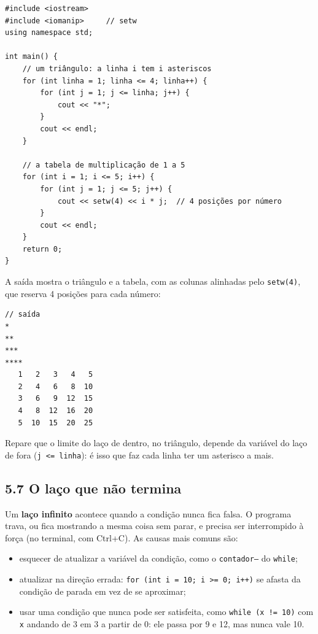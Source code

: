 \begin{codigo}
\begin{Verbatim}[breaklines=true, breaksymbolleft={}, fontsize=\footnotesize]
#include <iostream>
#include <iomanip>     // setw
using namespace std;

int main() {
    // um triângulo: a linha i tem i asteriscos
    for (int linha = 1; linha <= 4; linha++) {
        for (int j = 1; j <= linha; j++) {
            cout << "*";
        }
        cout << endl;
    }

    // a tabela de multiplicação de 1 a 5
    for (int i = 1; i <= 5; i++) {
        for (int j = 1; j <= 5; j++) {
            cout << setw(4) << i * j;  // 4 posições por número
        }
        cout << endl;
    }
    return 0;
}
\end{Verbatim}
\end{codigo}

A saída mostra o triângulo e a tabela, com as colunas alinhadas pelo \texttt{setw(4)}, que reserva 4 posições para cada número:

\begin{codigo}
\begin{Verbatim}[breaklines=true, breaksymbolleft={}, fontsize=\footnotesize]
// saída
*
**
***
****
   1   2   3   4   5
   2   4   6   8  10
   3   6   9  12  15
   4   8  12  16  20
   5  10  15  20  25
\end{Verbatim}
\end{codigo}

Repare que o limite do laço de dentro, no triângulo, depende da variável do laço de fora (\texttt{j <= linha}): é isso que faz cada linha ter um asterisco a mais.

\subsection{5.7 O laço que não termina}

Um \textbf{laço infinito} acontece quando a condição nunca fica falsa. O programa trava, ou fica mostrando a mesma coisa sem parar, e precisa ser interrompido à força (no terminal, com Ctrl+C). As causas mais comuns são:

\begin{itemize}
  \item esquecer de atualizar a variável da condição, como o \texttt{contador--} do \texttt{while};
  \item atualizar na direção errada: \texttt{for (int i = 10; i >= 0; i++)} se afasta da condição de parada em vez de se aproximar;
  \item usar uma condição que nunca pode ser satisfeita, como \texttt{while (x != 10)} com \texttt{x} andando de 3 em 3 a partir de 0: ele passa por 9 e 12, mas nunca vale 10.
\end{itemize}

